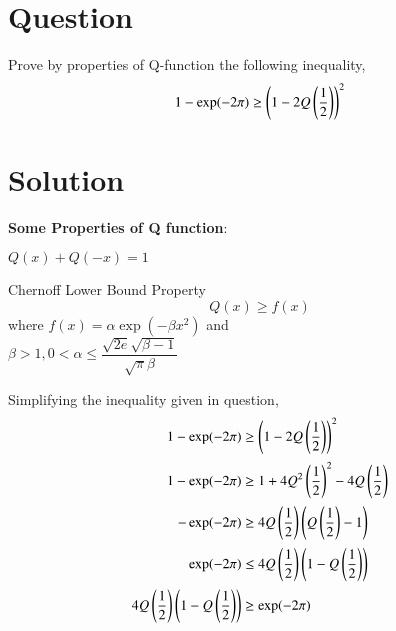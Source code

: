 \documentclass[journal,12pt,twocolumn]{IEEEtran}
\begin{document}
\section*{Question}
 Prove by properties of Q-function the following inequality,
 $$1-\exp(-2 \pi) \geq \left(1-2Q\left(\dfrac{1}{2}\right)\right)^2$$
\section*{Solution}
\textbf{Some Properties of Q function}:
\begin{lemma}\label{even}
    $Q(x)+Q(-x)=1$
\end{lemma}
\begin{lemma}\label{bound}
Chernoff Lower Bound Property
    $$Q(x)\geq f(x)$$
    where $f(x) = \alpha \exp(-\beta x^2)$ and \\[3pt]$\beta > 1, 0 < \alpha \leq \dfrac{\sqrt{2e}\sqrt{\beta-1}}{\sqrt{\pi}\beta} $
\end{lemma}

Simplifying the inequality given in question,
\begin{align}
    1-\exp(-2 \pi)  &\geq \left(1-2Q\left(\dfrac{1}{2}\right)\right)^2 \\[1.5pt]
    1-\exp(-2 \pi) &\geq 1+4Q^2\left(\dfrac{1}{2}\right)^2-4Q\left(\dfrac{1}{2}\right)\\[1.5pt]
    -\exp(-2 \pi) &\geq 4Q\left(\dfrac{1}{2}\right)\left(Q\left(\dfrac{1}{2}\right)-1\right) \\[1.5pt]
    \exp(-2 \pi) &\leq 4Q\left(\dfrac{1}{2}\right)\left(1-Q\left(\dfrac{1}{2}\right)\right) \\[1.5pt]
    4Q\left(\dfrac{1}{2}\right)\left(1-Q\left(\dfrac{1}{2}\right)\right)&\geq \exp(-2 \pi)
\end{align}
\end{document}
